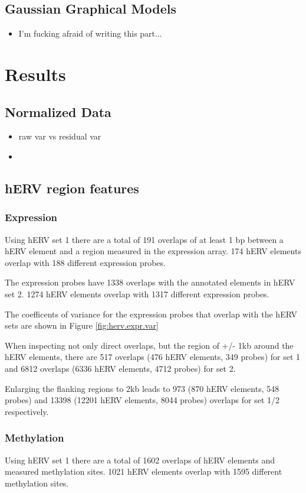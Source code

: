 \documentclass[a4paper,12pt]{article}
\begin{document}
\subsection{Gaussian Graphical Models}
\begin{itemize}
\item I'm fucking afraid of writing this part...
\end{itemize}

\newpage
\section{Results}
\subsection{Normalized Data}
\begin{itemize}
\item raw var vs residual var
\item 
\end{itemize}
\subsection{hERV region features}
\subsubsection{Expression}
Using hERV set 1 there are a total of 191 overlaps of at least 1 bp between a hERV element and a region measured in the expression array. 174 hERV elements overlap with 188 different expression probes. 

The expression probes have 1338 overlaps with the annotated elements in hERV set 2. 1274 hERV elements overlap with 1317 different expression probes.

The coefficents of variance for the expression probes that overlap with the hERV sets are shown in Figure \ref{fig:herv.expr.var}

When inspecting not only direct overlaps, but the region of +/- 1kb around the hERV elements, there are 517 overlaps (476 hERV elements, 349 probes) for set 1 and 6812 overlaps (6336 hERV elements, 4712 probes) for set 2.

Enlarging the flanking regions to 2kb leads to 973 (870 hERV elements, 548 probes) and 13398 (12201 hERV elements, 8044 probes) overlaps for set 1/2 respectively.



\subsubsection{Methylation}
Using hERV set 1 there are a total of 1602 overlaps of hERV elements and measured methylation sites. 1021 hERV elements overlap with 1595 different methylation sites.
\end{document}
